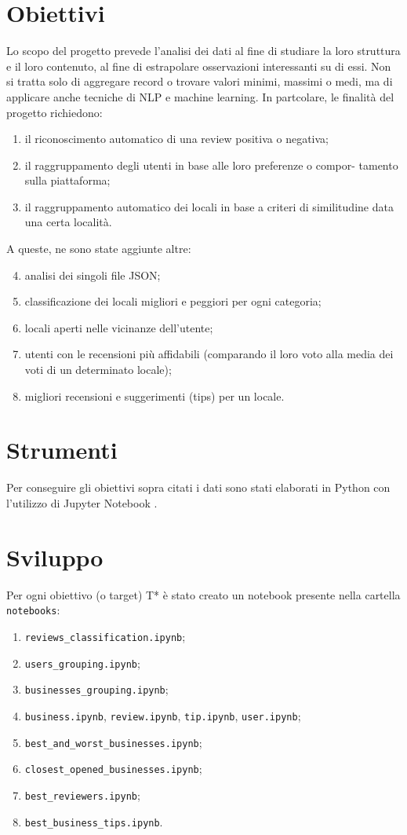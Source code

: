 \documentclass[12pt]{article}
\begin{document}
\section{Obiettivi}
Lo scopo del progetto prevede l'analisi dei dati al fine di studiare la loro struttura e il loro contenuto, al fine di estrapolare osservazioni interessanti su di essi. Non si tratta solo di aggregare record o trovare valori minimi, massimi o medi, ma di applicare anche tecniche di NLP e machine learning. In partcolare, le finalità del progetto richiedono:
\begin{enumerate}[label=T\arabic*)]
\item il riconoscimento automatico di una review positiva o negativa;
\item il raggruppamento degli utenti in base alle loro preferenze o compor-
tamento sulla piattaforma;
\item il raggruppamento automatico dei locali in base a criteri di similitudine data una certa località.
\end{enumerate}
A queste, ne sono state aggiunte altre:
\begin{enumerate}[label=T\arabic*)]
\setcounter{enumi}{3}
\item analisi dei singoli file JSON;
\item classificazione dei locali migliori e peggiori per ogni categoria;
\item locali aperti nelle vicinanze dell'utente;
\item utenti con le recensioni più affidabili (comparando il loro voto alla media dei voti di un determinato locale);
\item migliori recensioni e suggerimenti (tips) per un locale.
\end{enumerate}

\section{Strumenti}
Per conseguire gli obiettivi sopra citati i dati sono stati elaborati in Python con l'utilizzo di Jupyter Notebook \cite{jupyter}.

\section{Sviluppo}
Per ogni obiettivo (o target) T* è stato creato un notebook presente nella cartella \texttt{notebooks}:
\begin{enumerate}[label=T\arabic*)]
\item \texttt{reviews\_classification.ipynb};
\item \texttt{users\_grouping.ipynb};
\item \texttt{businesses\_grouping.ipynb};
\item \texttt{business.ipynb}, \texttt{review.ipynb}, \texttt{tip.ipynb}, \texttt{user.ipynb};
\item \texttt{best\_and\_worst\_businesses.ipynb};
\item \texttt{closest\_opened\_businesses.ipynb};
\item \texttt{best\_reviewers.ipynb};
\item \texttt{best\_business\_tips.ipynb}.
\end{enumerate}
\end{document}
